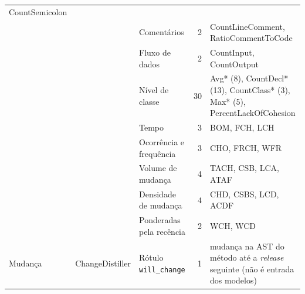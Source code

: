 \begin{table}[htbp]
\begin{tabularx}{\textwidth}{@{}l l l r >{\raggedright\arraybackslash}X@{}}
                                                    CountSemicolon \\
            & & Comentários                  & 2  & CountLineComment, RatioCommentToCode \\
            & & Fluxo de dados               & 2  & CountInput, CountOutput \\
            & & Nível de classe & 30 & Avg* (8), CountDecl* (13), CountClass* (3), Max* (5),
                                                    PercentLackOfCohesion \\
        \midrule
            & 
                & Tempo                      & 3  & BOM, FCH, LCH \\
            & & Ocorrência e frequência      & 3  & CHO, FRCH, WFR \\
            & & Volume de mudança            & 4  & TACH, CSB, LCA, ATAF \\
            & & Densidade de mudança         & 4  & CHD, CSBS, LCD, ACDF \\
            & & Ponderadas pela recência     & 2  & WCH, WCD \\
        \midrule
        Mudança & ChangeDistiller & Rótulo \texttt{will\_change} & 1 & mudança na AST do método até a \textit{release} seguinte
                                                                    (não é entrada dos modelos) \\
        \bottomrule
    \end{tabularx}
\end{table}%
